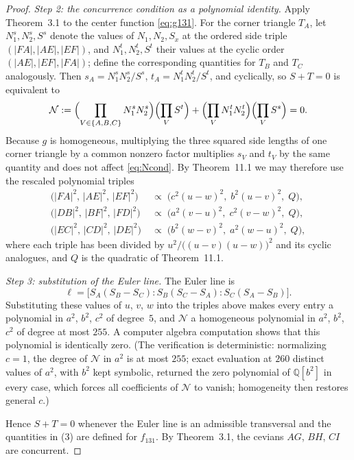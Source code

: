\documentclass[10pt,a4paper]{amsart}
\begin{document}
\begin{proof}
\emph{Step 2: the concurrence condition as a polynomial identity.}
Apply Theorem~3.1 to the center function \eqref{eq:g131}.  For the
corner triangle $T_A$, let $N_1^{s},N_2^{s},S^{s}$ denote the values of
$N_1,N_2,S_x$ at the ordered side triple $(|FA|,|AE|,|EF|)$, and
$N_1^{t},N_2^{t},S^{t}$ their values at the cyclic order
$(|AE|,|EF|,|FA|)$; define the corresponding quantities for $T_B$ and
$T_C$ analogously.  Then $s_A=N_1^{s}N_2^{s}/S^{s}$,
$t_A=N_1^{t}N_2^{t}/S^{t}$, and cyclically, so $S+T=0$ is equivalent to
\begin{equation}\label{eq:Ncond}
\mathcal N:=
\Bigl(\prod_{V\in\{A,B,C\}}N_1^{s}N_2^{s}\Bigr)
\Bigl(\prod_{V}S^{t}\Bigr)
+
\Bigl(\prod_{V}N_1^{t}N_2^{t}\Bigr)
\Bigl(\prod_{V}S^{s}\Bigr)=0 .
\end{equation}
Because $g$ is homogeneous, multiplying the three squared side lengths
of one corner triangle by a common nonzero factor multiplies $s_V$ and
$t_V$ by the same quantity and does not affect \eqref{eq:Ncond}.  By
Theorem~11.1 we may therefore use the rescaled polynomial triples
\[
\begin{aligned}
\bigl(|FA|^2,\,|AE|^2,\,|EF|^2\bigr)
&\;\propto\;\bigl(c^2(u-w)^2,\;b^2(u-v)^2,\;Q\bigr),\\
\bigl(|DB|^2,\,|BF|^2,\,|FD|^2\bigr)
&\;\propto\;\bigl(a^2(v-u)^2,\;c^2(v-w)^2,\;Q\bigr),\\
\bigl(|EC|^2,\,|CD|^2,\,|DE|^2\bigr)
&\;\propto\;\bigl(b^2(w-v)^2,\;a^2(w-u)^2,\;Q\bigr),
\end{aligned}
\]
where each triple has been divided by
$u^2/\bigl((u-v)(u-w)\bigr)^2$ and its cyclic analogues, and $Q$ is
the quadratic of Theorem~11.1.

\emph{Step 3: substitution of the Euler line.}
The Euler line is
\[
\ell=\bigl[S_A(S_B-S_C):S_B(S_C-S_A):S_C(S_A-S_B)\bigr].
\]
Substituting these values of $u$, $v$, $w$ into the triples above makes
every entry a polynomial in $a^2$, $b^2$, $c^2$ of degree~$5$, and
$\mathcal N$ a homogeneous polynomial in $a^2$, $b^2$, $c^2$ of degree
at most $255$.  A computer algebra computation shows that this
polynomial is identically zero.  (The verification is deterministic:
normalizing $c=1$, the degree of $\mathcal N$ in $a^2$ is at most
$255$; exact evaluation at $260$ distinct values of $a^2$, with $b^2$
kept symbolic, returned the zero polynomial of $\mathbb Q[b^2]$ in
every case, which forces all coefficients of $\mathcal N$ to vanish;
homogeneity then restores general $c$.)

Hence $S+T=0$ whenever the Euler line is an admissible transversal and
the quantities in (3) are defined for $f_{131}$.  By Theorem~3.1, the
cevians $AG$, $BH$, $CI$ are concurrent.
\end{proof}
\end{document}
